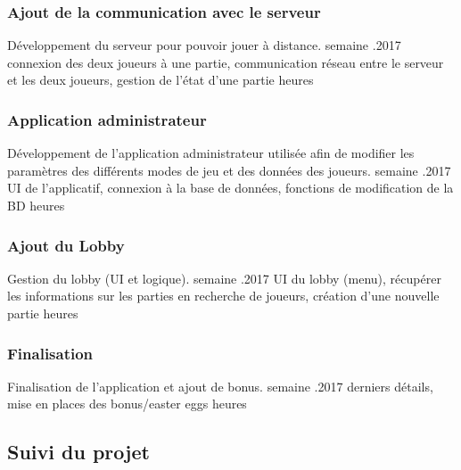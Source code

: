 \documentclass[a4paper,11pt]{article}
\begin{document}
	\subsubsection{Ajout de la communication avec le serveur}
	\begin{enumerate}[labelwidth=5em,leftmargin=8em]
		\objectif Développement du serveur pour pouvoir jouer à distance.
		 semaine
		.2017
		\partageTache connexion des deux joueurs à une partie, communication réseau entre le serveur et les deux joueurs, gestion de l'état d'une partie
		 heures
	\end{enumerate}

	\subsubsection{Application administrateur}
	\begin{enumerate}[labelwidth=5em,leftmargin=8em]
		\objectif Développement de l'application administrateur utilisée afin de modifier les paramètres des différents modes de jeu et des données des joueurs.
		 semaine
		.2017
		\partageTache UI de l'applicatif, connexion à la base de données, fonctions de modification de la BD
		 heures
	\end{enumerate}

	\subsubsection{Ajout du Lobby}
	\begin{enumerate}[labelwidth=5em,leftmargin=8em]
		\objectif Gestion du lobby (UI et logique).
		 semaine
		.2017
		\partageTache UI du lobby (menu), récupérer les informations sur les parties en recherche de joueurs, création d'une nouvelle partie
		 heures
	\end{enumerate}

	\subsubsection{Finalisation}
	\begin{enumerate}[labelwidth=5em,leftmargin=8em]
		\objectif Finalisation de l'application et ajout de bonus.
		 semaine
		.2017
		\partageTache derniers détails, mise en places des bonus/easter eggs
		 heures
	\end{enumerate}

	
	\subsection{Suivi du projet}
	
\end{document}
